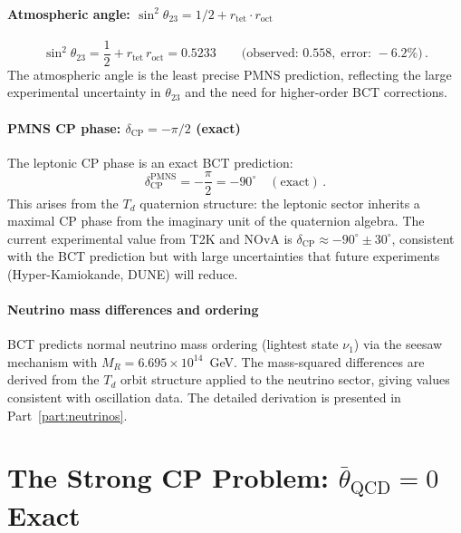 \documentclass[review,number,sort&compress]{elsarticle}
\newcommand{\roct}{r_{\mathrm{oct}}}
\newcommand{\rtet}{r_{\mathrm{tet}}}
\newcommand{\thetabar}{\bar{\theta}}
\newcommand{\MR}{M_R}
\newcommand{\Td}{T_d}
\begin{document}
\subsection{Atmospheric angle: $\sin^2\theta_{23} = 1/2 + \rtet\cdot\roct$}

\begin{equation}
  \sin^2\theta_{23} = \frac{1}{2} + \rtet\,\roct = 0.5233 \qquad
  \bigl(\text{observed: } 0.558,\;\text{error: } -6.2\%\bigr)\,.
  \label{eq:theta23}
\end{equation}
The atmospheric angle is the least precise PMNS prediction, reflecting
the large experimental uncertainty in $\theta_{23}$ and the need for
higher-order BCT corrections.

\subsection{PMNS CP phase: $\delta_{\mathrm{CP}} = -\pi/2$ (exact)}

The leptonic CP phase is an exact BCT prediction:
\begin{equation}
  \delta_{\mathrm{CP}}^{\mathrm{PMNS}} = -\frac{\pi}{2}
  = -90^\circ \quad (\text{exact})\,.
  \label{eq:deltaCP}
\end{equation}
This arises from the $\Td$ quaternion structure: the leptonic sector
inherits a maximal CP phase from the imaginary unit of the quaternion
algebra. The current experimental value from T2K and NOvA is
$\delta_{\mathrm{CP}} \approx -90^\circ \pm 30^\circ$, consistent with
the BCT prediction but with large uncertainties that future experiments
(Hyper-Kamiokande, DUNE) will reduce.

\subsection{Neutrino mass differences and ordering}

BCT predicts normal neutrino mass ordering (lightest state $\nu_1$)
via the seesaw mechanism with $\MR = 6.695 \times 10^{14}$~GeV.
The mass-squared differences are derived from the $\Td$ orbit
structure applied to the neutrino sector, giving values consistent
with oscillation data. The detailed derivation is presented in
Part~\ref{part:neutrinos}.


\part{The Strong CP Problem: $\thetabar_{\mathrm{QCD}} = 0$ Exact}
\label{part:strongCP}
\end{document}
